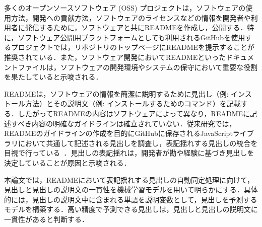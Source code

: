 \documentclass[uplatex,dvipdfmx,a4paper,twocolumn,base=11pt,jbase=11pt,ja=standard]{bxjsarticle}  %
\begin{document}
多くのオープンソースソフトウェア (OSS) プロジェクトは，ソフトウェアの使用方法，開発への貢献方法，ソフトウェアのライセンスなどの情報を開発者や利用者に発信するために，ソフトウェアと共にREADMEを作成し，公開する．特に，ソフトウェア公開用プラットフォームとしても利用されるGitHubを使用するプロジェクトでは，リポジトリのトップページにREADMEを提示することが推奨されている．また，ソフトウェア開発においてREADMEといったドキュメントファイルは，ソフトウェアの開発環境やシステムの保守において重要な役割を果たしていると示唆される\cite{IJCSI2013_Noela}．

READMEは，ソフトウェアの情報を簡潔に説明するために見出し（例: インストール方法）とその説明文（例: インストールするためのコマンド）を記載する．したがってREADMEの内容はソフトウェアによって異なり，READMEに記述すべき内容の明確なガイドラインは確立されていない．従来研究では，READMEのガイドラインの作成を目的にGitHubに保存されるJavaScriptライブラリにおいて共通して記述される見出しを調査し，表記揺れする見出しの統合を目視で行っている~\cite{IEICE2019_Ikeda}．見出しの表記揺れは，開発者が勘や経験に基づき見出しを決定していることが原因と示唆される．

本論文では，READMEにおいて表記揺れする見出しの自動同定処理に向けて，見出しと見出しの説明文の一貫性を機械学習モデルを用いて明らかにする．具体的には，見出しの説明文中に含まれる単語を説明変数として，見出しを予測するモデルを構築する．高い精度で予測できる見出しは，見出しと見出しの説明文に一貫性があると判断する．





\end{document}
